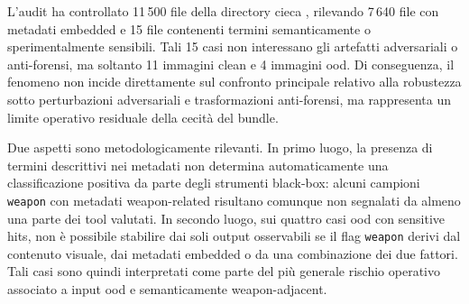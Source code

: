 L'audit ha controllato 11\,500 file della directory cieca
, rilevando
7\,640 file con metadati embedded e 15 file contenenti termini semanticamente o
sperimentalmente sensibili. Tali 15 casi non interessano gli artefatti
adversariali o anti-forensi, ma soltanto 11 immagini clean e 4 immagini
\gls{ood}. Di conseguenza, il fenomeno non incide direttamente sul confronto
principale relativo alla robustezza sotto perturbazioni adversariali e
trasformazioni anti-forensi, ma rappresenta un limite operativo residuale della
cecità del bundle.

Due aspetti sono metodologicamente rilevanti. In primo luogo, la presenza di
termini descrittivi nei metadati non determina automaticamente una classificazione
positiva da parte degli strumenti black-box: alcuni campioni \texttt{weapon} con
metadati weapon-related risultano comunque non segnalati da almeno una parte dei
tool valutati. In secondo luogo, sui quattro casi \gls{ood} con sensitive hits,
non è possibile stabilire dai soli output osservabili se il flag \texttt{weapon}
derivi dal contenuto visuale, dai metadati embedded o da una combinazione dei due
fattori. Tali casi sono quindi interpretati come parte del più generale rischio
operativo associato a input \gls{ood} e semanticamente weapon-adjacent.

